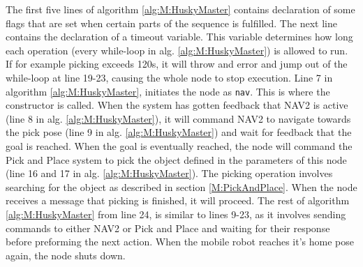 The first five lines of algorithm \ref{alg:M:HuskyMaster} contains declaration of some flags that are set when certain parts of the sequence is fulfilled. The next line contains the declaration of a timeout variable. This variable determines how long each operation (every while-loop in alg. \ref{alg:M:HuskyMaster}) is allowed to run. If for example picking exceeds 120s, it will throw and error and jump out of the while-loop at line 19-23, causing the whole node to stop execution.  Line 7 in algorithm \ref{alg:M:HuskyMaster}, initiates the node as \lstinline{nav}. This is where the constructor is called. When the system has gotten feedback that NAV2 is active (line 8 in alg. \ref{alg:M:HuskyMaster}), it will command NAV2 to navigate towards the pick pose (line 9 in alg. \ref{alg:M:HuskyMaster}) and wait for feedback that the goal is reached. When the goal is eventually reached, the node will command the Pick and Place system to pick the object defined in the parameters of this node (line 16 and 17 in alg. \ref{alg:M:HuskyMaster}). The picking operation involves searching for the object as described in section \ref{M:PickAndPlace}. When the node receives a message that picking is finished, it will proceed. The rest of algorithm \ref{alg:M:HuskyMaster} from line 24, is similar to lines 9-23, as it involves sending commands to either NAV2 or Pick and Place and waiting for their response before preforming the next action. When the mobile robot reaches it's home pose again, the node shuts down.








